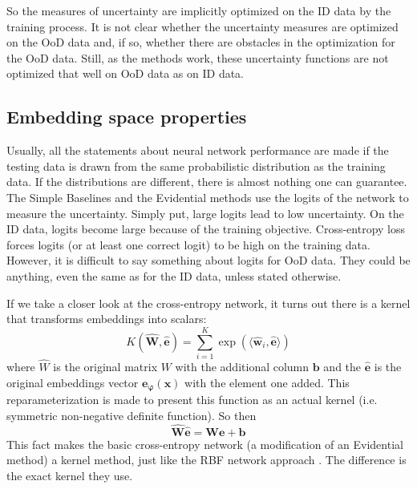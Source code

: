 \documentclass{article}
\begin{document}
So the measures of uncertainty are implicitly optimized on the ID data by the training process.
It is not clear whether the uncertainty measures are optimized on the OoD data and, if so, whether there are obstacles in the optimization for the OoD data.
Still, as the methods work, these uncertainty functions are not optimized that well on OoD data as on ID data.

\subsection{Embedding space properties}
Usually, all the statements about neural network performance are made if the testing data is drawn from the same probabilistic distribution as the training data.
If the distributions are different, there is almost nothing one can guarantee.
The Simple Baselines and the Evidential methods use the logits of the network to measure the uncertainty.
Simply put, large logits lead to low uncertainty.
On the ID data, logits become large because of the training objective.
Cross-entropy loss forces logits (or at least one correct logit) to be high on the training data.
However, it is difficult to say something about logits for OoD data.
They could be anything, even the same as for the ID data, unless stated otherwise.

If we take a closer look at the cross-entropy network, it turns out there is a kernel that transforms embeddings into scalars:
\begin{equation}
K(\hat{\boldsymbol{W}}, \hat{\boldsymbol{e}}) = \sum\limits_{i=1}^K \exp(\langle \hat{\boldsymbol{w}}_i, \hat{\boldsymbol{e}} \rangle)
\end{equation}
where $\hat{W}$ is the original matrix $W$ with the additional column $\boldsymbol{b}$ and the $\hat{\boldsymbol{e}}$ is the original embeddings vector $\boldsymbol{e}_{\boldsymbol{\varphi}}(\boldsymbol{x})$ with the element one added. This reparameterization is made to present this function as an actual kernel (i.e. symmetric non-negative definite function).
So then
\begin{equation}
\hat{\boldsymbol{W}} \hat{\boldsymbol{e}} = \boldsymbol{W} \boldsymbol{e} + \boldsymbol{b}
\end{equation}
This fact makes the basic cross-entropy network (a modification of an Evidential method) a kernel method, just like the RBF network approach \cite{duq}. The difference is the exact kernel they use.
\end{document}
